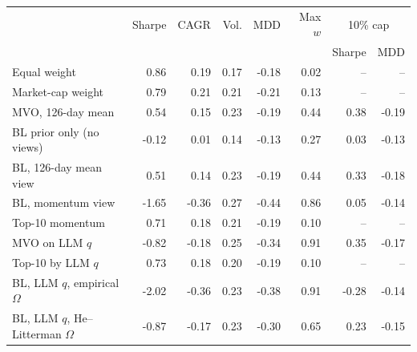 \begin{tabular}{lrrrrr|rr}
\toprule
 & Sharpe & CAGR & Vol. & MDD & Max $w$ & \multicolumn{2}{c}{10\% cap} \\
 & & & & & & Sharpe & MDD \\
\midrule
Equal weight & 0.86 & 0.19 & 0.17 & -0.18 & 0.02 & -- & -- \\
Market-cap weight & 0.79 & 0.21 & 0.21 & -0.21 & 0.13 & -- & -- \\
MVO, 126-day mean & 0.54 & 0.15 & 0.23 & -0.19 & 0.44 & 0.38 & -0.19 \\
BL prior only (no views) & -0.12 & 0.01 & 0.14 & -0.13 & 0.27 & 0.03 & -0.13 \\
BL, 126-day mean view & 0.51 & 0.14 & 0.23 & -0.19 & 0.44 & 0.33 & -0.18 \\
BL, momentum view & -1.65 & -0.36 & 0.27 & -0.44 & 0.86 & 0.05 & -0.14 \\
Top-10 momentum & 0.71 & 0.18 & 0.21 & -0.19 & 0.10 & -- & -- \\
MVO on LLM $q$ & -0.82 & -0.18 & 0.25 & -0.34 & 0.91 & 0.35 & -0.17 \\
Top-10 by LLM $q$ & 0.73 & 0.18 & 0.20 & -0.19 & 0.10 & -- & -- \\
BL, LLM $q$, empirical $\Omega$ & -2.02 & -0.36 & 0.23 & -0.38 & 0.91 & -0.28 & -0.14 \\
BL, LLM $q$, He--Litterman $\Omega$ & -0.87 & -0.17 & 0.23 & -0.30 & 0.65 & 0.23 & -0.15 \\
\bottomrule
\end{tabular}
